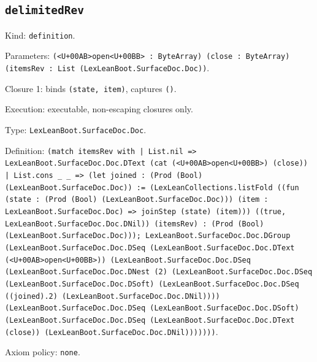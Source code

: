 \documentclass[11pt]{article}
\begin{document}
\subsection*{\texttt{delimitedRev}}
\noindent Kind: \texttt{definition}.\par
\noindent Parameters: \texttt{(<U+00AB>open<U+00BB> : ByteArray) (close : ByteArray) (itemsRev : List (LexLeanBoot.SurfaceDoc.Doc))}.\par
\noindent Closure 1: binds \texttt{(state, item)}, captures \texttt{()}.\par
\noindent Execution: executable, non-escaping closures only.\par
\noindent Type: \texttt{LexLeanBoot.SurfaceDoc.Doc}.\par
\noindent Definition: \texttt{(match itemsRev with | List.nil => LexLeanBoot.SurfaceDoc.Doc.DText (cat (<U+00AB>open<U+00BB>) (close)) | List.cons \_ \_ => (let joined : (Prod (Bool) (LexLeanBoot.SurfaceDoc.Doc)) := (LexLeanCollections.listFold ((fun (state : (Prod (Bool) (LexLeanBoot.SurfaceDoc.Doc))) (item : LexLeanBoot.SurfaceDoc.Doc) => joinStep (state) (item))) ((true, LexLeanBoot.SurfaceDoc.Doc.DNil)) (itemsRev) : (Prod (Bool) (LexLeanBoot.SurfaceDoc.Doc))); LexLeanBoot.SurfaceDoc.Doc.DGroup (LexLeanBoot.SurfaceDoc.Doc.DSeq (LexLeanBoot.SurfaceDoc.Doc.DText (<U+00AB>open<U+00BB>)) (LexLeanBoot.SurfaceDoc.Doc.DSeq (LexLeanBoot.SurfaceDoc.Doc.DNest (2) (LexLeanBoot.SurfaceDoc.Doc.DSeq (LexLeanBoot.SurfaceDoc.Doc.DSoft) (LexLeanBoot.SurfaceDoc.Doc.DSeq ((joined).2) (LexLeanBoot.SurfaceDoc.Doc.DNil)))) (LexLeanBoot.SurfaceDoc.Doc.DSeq (LexLeanBoot.SurfaceDoc.Doc.DSoft) (LexLeanBoot.SurfaceDoc.Doc.DSeq (LexLeanBoot.SurfaceDoc.Doc.DText (close)) (LexLeanBoot.SurfaceDoc.Doc.DNil)))))))}.\par
\noindent Axiom policy: \texttt{none}.\par
\end{document}
